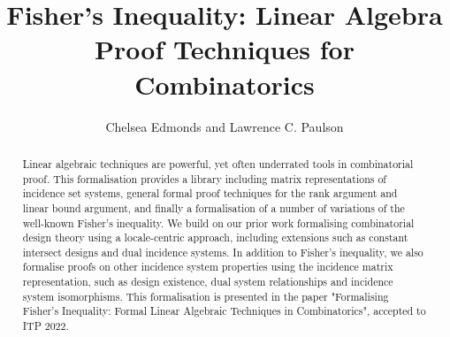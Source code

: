 \documentclass[11pt,a4paper]{article}
\begin{document}
\title{Fisher's Inequality: Linear Algebra Proof Techniques for Combinatorics}
\author{Chelsea Edmonds and Lawrence C. Paulson}
\maketitle

\begin{abstract}
  Linear algebraic techniques are powerful, yet often underrated tools in combinatorial proof. This formalisation provides a library including matrix representations of incidence set systems, general formal proof techniques for the rank argument and linear bound argument, and finally a formalisation of a number of variations of the well-known Fisher's inequality. We build on our prior work formalising combinatorial design theory using a locale-centric approach, including extensions such as constant intersect designs and dual incidence systems. In addition to Fisher's inequality, we also formalise proofs on other incidence system properties using the incidence matrix representation, such as design existence, dual system relationships and incidence system isomorphisms. This formalisation is presented in the paper "Formalising Fisher's Inequality: Formal Linear Algebraic Techniques in Combinatorics", accepted to ITP 2022.
\end{abstract}

\tableofcontents





\end{document}
